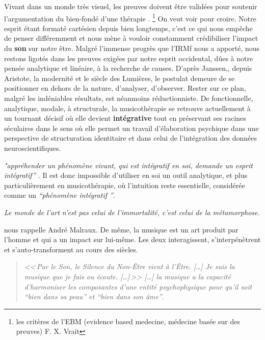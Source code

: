 Vivant dans un monde très visuel, les preuves doivent être
validées pour soutenir l'argumentation du bien-fondé d'une thérapie
\autocite[ch. II, pp. 105--106 ]{vrait_musicotherapie_2018}. \footnote{
	les critères de l'EBM (evidence based medecine, médecine basée sur des 
        preuves) F. X. Vrait }
      On veut voir pour croire.
Notre esprit étant formaté cartésien depuis bien longtemps, c'est ce qui nous 
empêche de penser différemment 
et nous mène à vouloir constamment crédibiliser l'impact 
du \textbf{son} sur notre être.
Malgré l'immense progrès que l'IRMf nous a apporté, nous restons
  ligotés dans les preuves exigées par notre esprit occidental, dûes à
  notre pensée analytique et linéaire, à la recherche de
  causes.
  D'après Janssen,\autocite[201]{van_eersel_cerveau}, depuis Aristote, la modernité et le
siècle des Lumières, le postulat demeure de se positionner en dehors
de la nature, d'analyser, d'observer. Rester sur ce plan, malgré les
indéniables résultats, est néanmoins
réductionniste.
De fonctionnelle, analytique, mo\-da\-le,  à 
struc\-tu\-rale, la musicothérapie  se retrouve actuellement 
 à un tournant décisif où elle devient 
 \textbf{ intégrative} tout en préservant ses racines
 séculaires dans le sens où elle permet un travail d'élaboration psychique dans une perspective de structuration identitaire \autocite[ch. III, p. 53, 
105]{vrait_musicotherapie_2018} et dans celui de l'intégration des données 
neuroscientifiques.

\textit{"appréhender un phénomène vivant, qui est intégratif en soi, demande un esprit
  intégratif''} \autocite[201]{van_eersel_cerveau}.
Il est donc impossible d'utiliser en soi un outil analytique, et
plus 
particulièrement en musicothérapie, où l'intuition reste essentielle, 
considérée comme un \textit{``phénomène intégratif ''}.  

\emph{Le monde de
	l'art n'est pas celui de l'immortalité, c'est celui de la
        métamorphose.}
      
      nous rappelle André Malraux.
      De même, la musique est un art produit par l'homme et qui a un impact
sur lui-même. Les deux interagissent, s'interpénètrent et s'auto-transforment
au cours des siècles.
\begin{quotation}
\emph{<<\,\emph{Par le Son, le Silence du Non-Être vient à l'Être}. [\dots] 
\textsl{Je suis}
	\emph{la musique que je fais ou écoute}. [\dots]\,>>
[\ldots] \emph{la musique a la capacité d'harmoniser
les composantes d'une entité psychophysique pour qu'il soit ``bien
dans sa peau'' et ``bien dans son âme}''}.\, \autocite[ch. 1, p.8]{viret:b}
\end{quotation}

